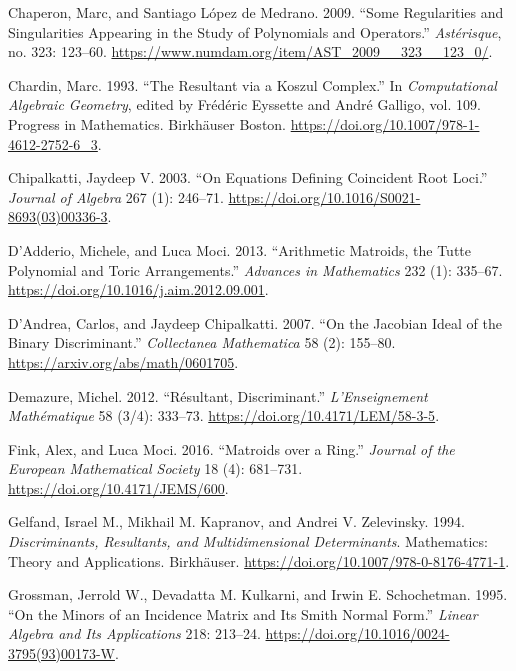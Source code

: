\documentclass[
  11pt,
  a4paper,
]{article}
\newlength{\cslhangindent}
\newenvironment{CSLReferences}[2] %
 {\begin{list}{}{%
  \setlength{\itemindent}{0pt}
  \setlength{\leftmargin}{0pt}
  \setlength{\parsep}{0pt}
  \ifodd #1
   \setlength{\leftmargin}{\cslhangindent}
   \setlength{\itemindent}{-1\cslhangindent}
  \fi
  \setlength{\itemsep}{#2\baselineskip}}}
 {\end{list}}
\begin{document}
\begin{CSLReferences}{1}{1}
Chaperon, Marc, and Santiago López de Medrano. 2009. {``Some
Regularities and Singularities Appearing in the Study of Polynomials and
Operators.''} \emph{Ast{é}risque}, no. 323: 123--60.
\url{https://www.numdam.org/item/AST_2009__323__123_0/}.

Chardin, Marc. 1993. {``The Resultant via a {Koszul} Complex.''} In
\emph{Computational Algebraic Geometry}, edited by Frédéric Eyssette and
André Galligo, vol. 109. Progress in Mathematics. Birkh{ä}user Boston.
\url{https://doi.org/10.1007/978-1-4612-2752-6_3}.

Chipalkatti, Jaydeep V. 2003. {``On Equations Defining Coincident Root
Loci.''} \emph{Journal of Algebra} 267 (1): 246--71.
\url{https://doi.org/10.1016/S0021-8693(03)00336-3}.

D'Adderio, Michele, and Luca Moci. 2013. {``Arithmetic Matroids, the
{T}utte Polynomial and Toric Arrangements.''} \emph{Advances in
Mathematics} 232 (1): 335--67.
\url{https://doi.org/10.1016/j.aim.2012.09.001}.

D'Andrea, Carlos, and Jaydeep Chipalkatti. 2007. {``On the Jacobian
Ideal of the Binary Discriminant.''} \emph{Collectanea Mathematica} 58
(2): 155--80. \url{https://arxiv.org/abs/math/0601705}.

Demazure, Michel. 2012. {``R{é}sultant, Discriminant.''}
\emph{L'Enseignement Math{é}matique} 58 (3/4): 333--73.
\url{https://doi.org/10.4171/LEM/58-3-5}.

Fink, Alex, and Luca Moci. 2016. {``Matroids over a Ring.''}
\emph{Journal of the European Mathematical Society} 18 (4): 681--731.
\url{https://doi.org/10.4171/JEMS/600}.

Gelfand, Israel M., Mikhail M. Kapranov, and Andrei V. Zelevinsky. 1994.
\emph{Discriminants, Resultants, and Multidimensional Determinants}.
Mathematics: Theory and Applications. Birkh{ä}user.
\url{https://doi.org/10.1007/978-0-8176-4771-1}.

Grossman, Jerrold W., Devadatta M. Kulkarni, and Irwin E. Schochetman.
1995. {``On the Minors of an Incidence Matrix and Its {Smith} Normal
Form.''} \emph{Linear Algebra and Its Applications} 218: 213--24.
\url{https://doi.org/10.1016/0024-3795(93)00173-W}.


\end{CSLReferences}
\end{document}
